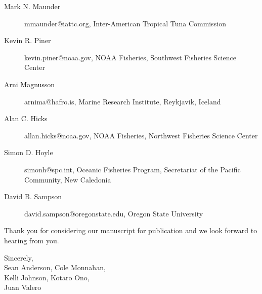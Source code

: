 \documentclass[letterpaper,11pt]{letter}
\begin{document}
\begin{letter}{}
\begin{description}
  \item [Mark N. Maunder] mmaunder@iattc.org, Inter-American Tropical Tuna
    Commission
  \item [Kevin R. Piner] kevin.piner@noaa.gov, NOAA Fisheries, Southwest
    Fisheries Science Center
  \item [Arni Magnusson] arnima@hafro.is, Marine Research Institute, Reykjavik,
    Iceland
  \item [Alan C. Hicks] allan.hicks@noaa.gov, NOAA Fisheries, Northwest
    Fisheries Science Center
  \item [Simon D. Hoyle] simonh@spc.int, Oceanic Fisheries Program, Secretariat
    of the Pacific Community, New Caledonia
  \item [David B. Sampson] david.sampson@oregonstate.edu, Oregon State
    University
\end{description}

Thank you for considering our manuscript for publication and we look forward to
hearing from you.

\bigskip
\closing{Sincerely,\\
Sean Anderson, Cole Monnahan,\\Kelli Johnson, Kotaro Ono,\\Juan Valero}

\end{letter}
\end{document}
